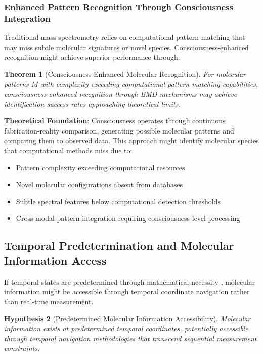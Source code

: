 \documentclass[11pt,a4paper]{article}
\newtheorem{theorem}{Theorem}[section]
\newtheorem{hypothesis}[theorem]{Hypothesis}
\theoremstyle{remark}
\begin{document}
\subsubsection{Enhanced Pattern Recognition Through Consciousness Integration}

Traditional mass spectrometry relies on computational pattern matching that may miss subtle molecular signatures or novel species. Consciousness-enhanced recognition might achieve superior performance through:

\begin{theorem}[Consciousness-Enhanced Molecular Recognition]
For molecular patterns $M$ with complexity exceeding computational pattern matching capabilities, consciousness-enhanced recognition through BMD mechanisms may achieve identification success rates approaching theoretical limits.
\end{theorem}

\textbf{Theoretical Foundation}: Consciousness operates through continuous fabrication-reality comparison, generating possible molecular patterns and comparing them to observed data. This approach might identify molecular species that computational methods miss due to:

\begin{itemize}
\item Pattern complexity exceeding computational resources
\item Novel molecular configurations absent from databases
\item Subtle spectral features below computational detection thresholds
\item Cross-modal pattern integration requiring consciousness-level processing
\end{itemize}

\subsection{Temporal Predetermination and Molecular Information Access}

If temporal states are predetermined through mathematical necessity \cite{sachikonye2024temporal}, molecular information might be accessible through temporal coordinate navigation rather than real-time measurement.

\begin{hypothesis}[Predetermined Molecular Information Accessibility]
Molecular information exists at predetermined temporal coordinates, potentially accessible through temporal navigation methodologies that transcend sequential measurement constraints.
\end{hypothesis}
\end{document}
